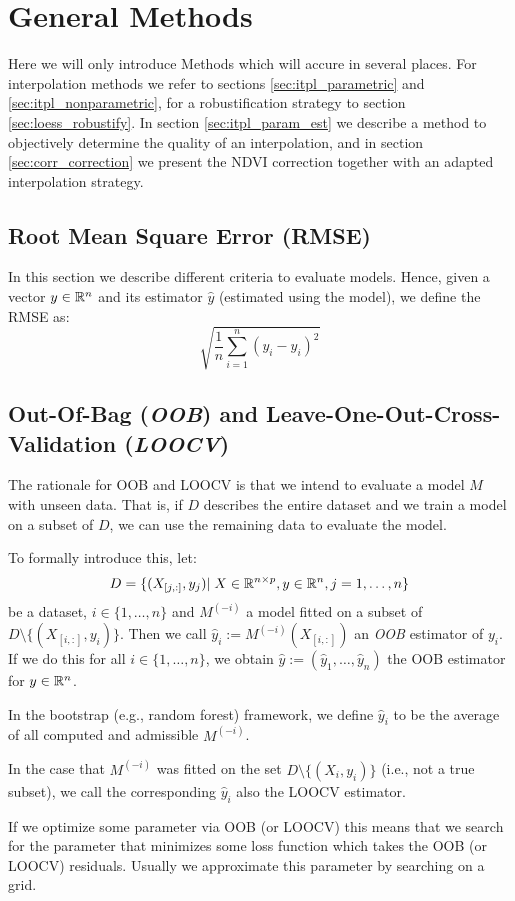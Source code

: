 \section{General Methods}{\label{sec:general_methods}
	Here we will only introduce Methods which will accure in several places. For interpolation methods we refer to sections \ref{sec:itpl_parametric} and \ref{sec:itpl_nonparametric}, for a robustification strategy to section \ref{sec:loess_robustify}. In section \ref{sec:itpl_param_est} we describe a method to objectively determine the quality of an interpolation, and in section \ref{sec:corr_correction} we present the NDVI correction together with an adapted interpolation strategy.


	\subsection{Root Mean Square Error (RMSE)}
		In this section we describe different criteria to evaluate models. Hence, given a vector $y\in \mathbb{R}^n$ and its estimator $\hat y$ (estimated using the model), we define the RMSE as:
		\begin{equation}
			\label{eq:rmse}
			 \sqrt{\frac{1}{n}\sum_{i=1}^n (y_i - \hat y_i)^2}
		\end{equation}
		
		\subsection{Out-Of-Bag (\textit{OOB}) and Leave-One-Out-Cross-Validation (\textit{LOOCV})}{ \label{sec:OOB_LOOCV}
		The rationale for OOB and LOOCV is that we intend to evaluate a model $M$ with unseen data. That is, if $D$ describes the entire dataset and we train a model on a subset of $D$, we can use the remaining data to evaluate the model. 
		
		To formally introduce this, let:
		$$
			D=\{(X_{[j,:]},y_j)|\; X\in\mathbb{R}^{n\times p}, y\in \mathbb{R}^n, j=1,\dots,n\}
		$$
		be a dataset, $i\in \{1,\dots,n\}$ and $M^{(-i)}$ a model fitted on a subset of $D\setminus\{(X_{[i,:]},y_i)\}$. Then we call $\hat y_i:= M^{(-i)}(X_{[i,:]})$ an \textit{OOB} estimator of $y_i$. If we do this for all $i\in\{1,\dots,n\}$, we obtain $\hat y := \left(\hat y_1,\dots,\hat y_n\right)$ the OOB estimator for $y\in \mathbb{R}^n$.

		In the bootstrap (e.g., random forest) framework, we define $\hat y_i$ to be the average of all computed and admissible $M^{(-i)}$. 
		
		In the case that $M^{(-i)}$ was fitted on the set $D\setminus\{(X_i,y_i)\}$ (i.e., not a true subset), we call the corresponding $\hat y_i$ also the LOOCV estimator.	

		If we optimize some parameter via OOB (or LOOCV) this means that we search for the parameter that minimizes some loss function which takes the OOB (or LOOCV) residuals. Usually we approximate this parameter by searching on a grid. 
	}

}
